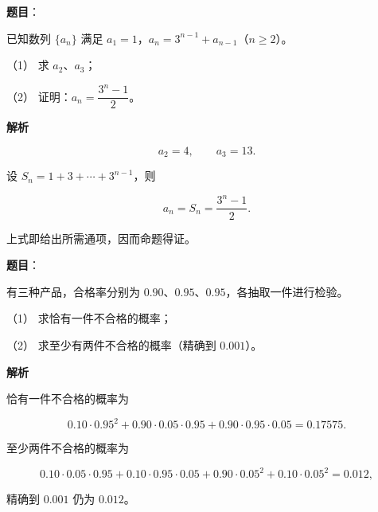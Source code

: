\begin{answer}

\textbf{题目}：

已知数列 $\{a_n\}$ 满足 $a_1=1$，$a_n=3^{n-1}+a_{n-1}$（$n\geqslant2$）。

（1） 求 $a_2\text{、}a_3$；

（2） 证明：$a_n=\dfrac{3^n-1}{2}$。

\textbf{解析}


\nopagebreak[4]
\[
a_2=4,\qquad a_3=13.
\]

设 $S_n=1+3+\cdots+3^{n-1}$，则

\nopagebreak[4]
\[
a_n=S_n=\frac{3^n-1}{2}.
\]


上式即给出所需通项，因而命题得证。



\end{answer}
\begin{answer}

\textbf{题目}：

有三种产品，合格率分别为 $0.90\text{、}0.95\text{、}0.95$，各抽取一件进行检验。

（1） 求恰有一件不合格的概率；

（2） 求至少有两件不合格的概率（精确到 $0.001$）。

\textbf{解析}


恰有一件不合格的概率为

\nopagebreak[4]
\[
0.10\cdot0.95^2
+0.90\cdot0.05\cdot0.95
+0.90\cdot0.95\cdot0.05
=0.17575.
\]


至少两件不合格的概率为

\nopagebreak[4]
\[
0.10\cdot0.05\cdot0.95
+0.10\cdot0.95\cdot0.05
+0.90\cdot0.05^2
+0.10\cdot0.05^2
=0.012,
\]

精确到 $0.001$ 仍为 $0.012$。



\end{answer}
